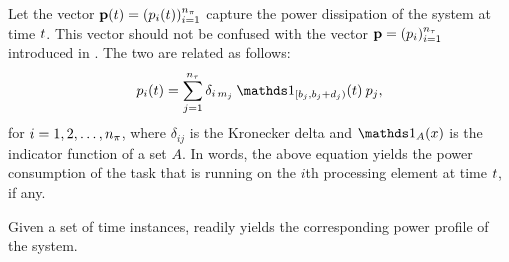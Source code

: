 Let the vector $\mathbf{p}(t) = (p_i(t))_{i = 1}^{{n_\pi}}$ capture the power dissipation
of the system at time $t$. This vector should not be confused with the vector
$\mathbf{p} = (p_i)_{i = 1}^{{n_\tau}}$ introduced in . The two
are related as follows:
\begin{equation} \elab{power}
  p_i(\t) = \sum_{j = 1}^{\nt} \delta_{i\,m_j} \: \one_{[\b_j, \b_j + \d_j)}(\t) \: p_j,
\end{equation}
for $i = 1, 2, \dots, {n_\pi}$, where $\delta_{ij}$ is the Kronecker delta and
$\one_A(x)$ is the indicator function of a set $A$. In words, the above equation
yields the power consumption of the task that is running on the $i$th processing
element at time $t$, if any.

Given a set of time instances,  readily yields the corresponding
power profile of the system.

